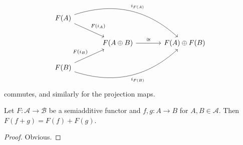 \documentclass{memoir}
\begin{document}
\begin{equation}
    \begin{tikzcd}[column sep=large]
        F(A) \arrow[dr,"F(i_A)"] \arrow[drr,bend left=30,"i_{F(A)}"] &  \\
                                                             & F(A\oplus B) \arrow[r,"\cong"] & F(A)\oplus F(B)  \\
        F(B) \arrow[ur,"F(i_B)"] \arrow[urr,bend right=30,swap,"i_{F(B)}"] & 
    \end{tikzcd}
\end{equation}
commutes, and similarly for the projection maps.
\begin{proposition}
    \label{prop:sa}
    Let $F:\mathcal A\to\mathcal B$ be a semiadditive functor and $f,g:A\to B$ for $A,B\in\mathcal A$.
    Then $F(f+g) = F(f)+F(g)$.
\end{proposition}
\begin{proof}
    Obvious.
\end{proof}
\end{document}
